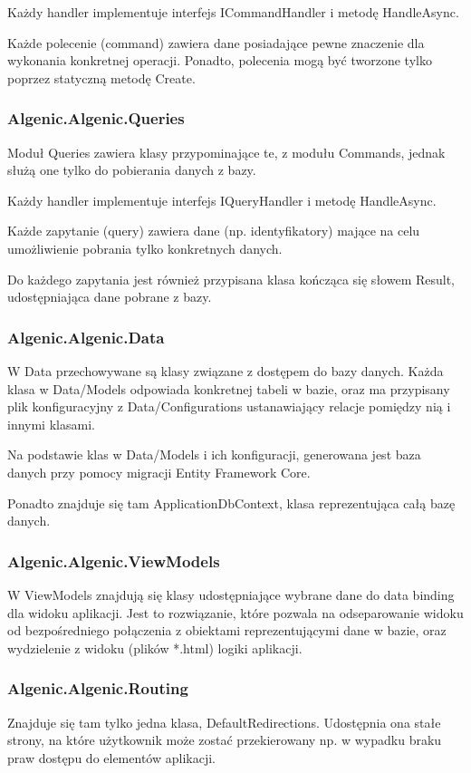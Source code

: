 \documentclass{article}
\begin{document}
Każdy handler implementuje interfejs ICommandHandler i metodę HandleAsync.

Każde polecenie (command) zawiera dane posiadające pewne znaczenie dla wykonania konkretnej operacji. Ponadto, polecenia mogą być tworzone tylko poprzez statyczną metodę Create.
\subsubsection{Algenic.Algenic.Queries}
Moduł Queries zawiera klasy przypominające te, z modułu Commands, jednak służą one tylko do pobierania danych z bazy.

Każdy handler implementuje interfejs IQueryHandler i metodę HandleAsync.

Każde zapytanie (query) zawiera dane (np. identyfikatory) mające na celu umożliwienie pobrania tylko konkretnych danych.

Do każdego zapytania jest również przypisana klasa kończąca się słowem Result, udostępniająca dane pobrane z bazy.
\subsubsection{Algenic.Algenic.Data}
W Data przechowywane są klasy związane z dostępem do bazy danych. Każda klasa w Data/Models odpowiada konkretnej tabeli w bazie, oraz ma przypisany plik konfiguracyjny z Data/Configurations ustanawiający relacje pomiędzy nią i innymi klasami.

Na podstawie klas w Data/Models i ich konfiguracji, generowana jest baza danych przy pomocy migracji Entity Framework Core.

Ponadto znajduje się tam ApplicationDbContext, klasa reprezentująca całą bazę danych.
\subsubsection{Algenic.Algenic.ViewModels}
W ViewModels znajdują się klasy udostępniające wybrane dane do data binding dla widoku aplikacji. Jest to rozwiązanie, które pozwala na odseparowanie widoku od bezpośredniego połączenia z obiektami reprezentującymi dane w bazie, oraz wydzielenie z widoku (plików *.html) logiki aplikacji.
\subsubsection{Algenic.Algenic.Routing}
Znajduje się tam tylko jedna klasa, DefaultRedirections. Udostępnia ona stałe strony, na które użytkownik może zostać przekierowany np. w wypadku braku praw dostępu do elementów aplikacji.
\end{document}
